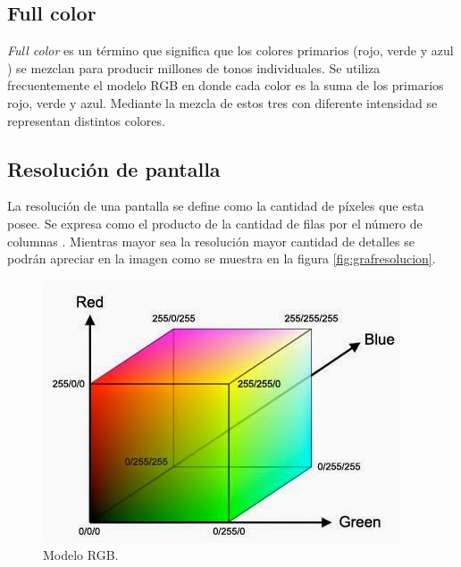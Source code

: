 \subsection{Full color}
\textit{Full color} es un término que significa que los colores primarios (rojo, verde y azul ) se mezclan para producir millones de tonos individuales. Se utiliza frecuentemente el modelo RGB en donde cada color es la suma de los primarios rojo, verde y azul. Mediante la mezcla de estos tres con diferente intensidad se representan distintos colores.



\subsection{Resolución de pantalla}
La resolución de una pantalla se define como la cantidad de píxeles que esta posee. Se expresa como el producto de la cantidad de filas por el número de columnas \citep{WIKIRESOL}. Mientras mayor sea la resolución mayor cantidad de detalles se podrán apreciar en la imagen como se muestra en la figura \ref{fig:grafresolucion}.

\begin{figure}[htpb]
	\centering
	\includegraphics[scale=0.6]{Figures/modelorgb.jpg} 
	\caption{Modelo RGB\protect\footnotemark.}
	\label{fig:grafrgb}
\end{figure}

